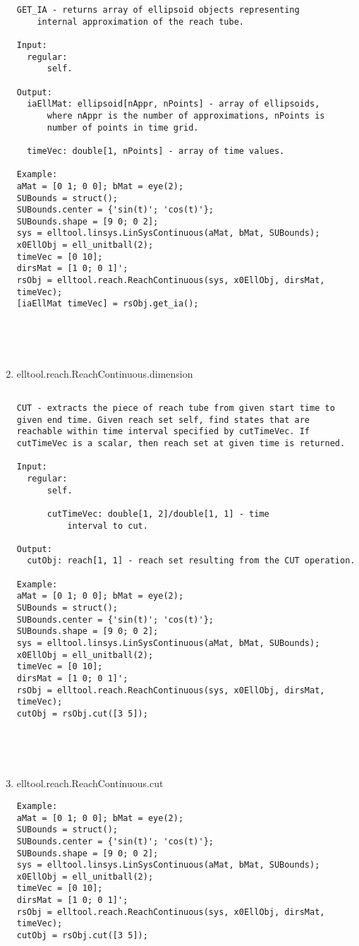 \begin{enumerate}
\begin{lstlisting}
GET_IA - returns array of ellipsoid objects representing
    internal approximation of the reach tube.

Input:
  regular:
      self.

Output:
  iaEllMat: ellipsoid[nAppr, nPoints] - array of ellipsoids,
      where nAppr is the number of approximations, nPoints is
      number of points in time grid.

  timeVec: double[1, nPoints] - array of time values.

Example:
aMat = [0 1; 0 0]; bMat = eye(2);
SUBounds = struct();
SUBounds.center = {'sin(t)'; 'cos(t)'};
SUBounds.shape = [9 0; 0 2];
sys = elltool.linsys.LinSysContinuous(aMat, bMat, SUBounds);
x0EllObj = ell_unitball(2);
timeVec = [0 10];
dirsMat = [1 0; 0 1]';
rsObj = elltool.reach.ReachContinuous(sys, x0EllObj, dirsMat, timeVec);
[iaEllMat timeVec] = rsObj.get_ia();





\end{lstlisting}
\fontfamily{\familydefault}
\selectfont
\item {elltool.reach.ReachContinuous.dimension}
\selectfont
\begin{lstlisting}

CUT - extracts the piece of reach tube from given start time to
given end time. Given reach set self, find states that are
reachable within time interval specified by cutTimeVec. If
cutTimeVec is a scalar, then reach set at given time is returned.

Input:
  regular:
      self.

      cutTimeVec: double[1, 2]/double[1, 1] - time
          interval to cut.

Output:
  cutObj: reach[1, 1] - reach set resulting from the CUT operation.

Example:
aMat = [0 1; 0 0]; bMat = eye(2);
SUBounds = struct();
SUBounds.center = {'sin(t)'; 'cos(t)'};
SUBounds.shape = [9 0; 0 2];
sys = elltool.linsys.LinSysContinuous(aMat, bMat, SUBounds);
x0EllObj = ell_unitball(2);
timeVec = [0 10];
dirsMat = [1 0; 0 1]';
rsObj = elltool.reach.ReachContinuous(sys, x0EllObj, dirsMat, timeVec);
cutObj = rsObj.cut([3 5]);





\end{lstlisting}
\fontfamily{\familydefault}
\selectfont
\item {elltool.reach.ReachContinuous.cut}
\selectfont
\begin{lstlisting}
Example:
aMat = [0 1; 0 0]; bMat = eye(2);
SUBounds = struct();
SUBounds.center = {'sin(t)'; 'cos(t)'};
SUBounds.shape = [9 0; 0 2];
sys = elltool.linsys.LinSysContinuous(aMat, bMat, SUBounds);
x0EllObj = ell_unitball(2);
timeVec = [0 10];
dirsMat = [1 0; 0 1]';
rsObj = elltool.reach.ReachContinuous(sys, x0EllObj, dirsMat, timeVec);
cutObj = rsObj.cut([3 5]);




\end{lstlisting}
\end{enumerate}
